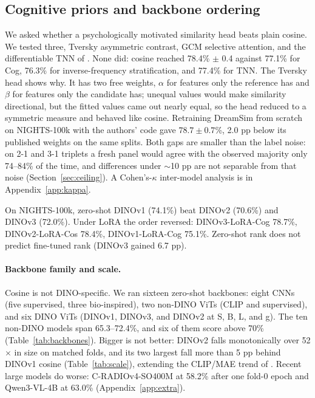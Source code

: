 \documentclass{article}
\begin{document}
\subsection{Cognitive priors and backbone ordering}

We asked whether a psychologically motivated similarity head beats plain cosine. We tested three, Tversky asymmetric contrast, GCM selective attention, and the differentiable TNN of \citet{doumbouya2025tversky}. None did: cosine reached 78.4\% $\pm$ 0.4 against 77.1\% for Cog, 76.3\% for inverse-frequency stratification, and 77.4\% for TNN. The Tversky head shows why. It has two free weights, $\alpha$ for features only the reference has and $\beta$ for features only the candidate has; unequal values would make similarity directional, but the fitted values came out nearly equal, so the head reduced to a symmetric measure and behaved like cosine. Retraining DreamSim from scratch on NIGHTS-100k with the authors' code gave $78.7 \pm 0.7$\%, 2.0 pp below its published weights on the same splits. Both gaps are smaller than the label noise: on 2-1 and 3-1 triplets a fresh panel would agree with the observed majority only 74--84\% of the time, and differences under $\sim$10 pp are not separable from that noise (Section~\ref{sec:ceiling}). A Cohen's-$\kappa$ inter-model analysis is in Appendix~\ref{app:kappa}.

On NIGHTS-100k, zero-shot DINOv1 (74.1\%) beat DINOv2 (70.6\%) and DINOv3 (72.0\%). Under LoRA the order reversed: DINOv3-LoRA-Cog 78.7\%, DINOv2-LoRA-Cos 78.4\%, DINOv1-LoRA-Cog 75.1\%. Zero-shot rank does not predict fine-tuned rank (DINOv3 gained 6.7 pp).

\paragraph{Backbone family and scale.} Cosine is not DINO-specific. We ran sixteen zero-shot backbones: eight CNNs (five supervised, three bio-inspired), two non-DINO ViTs (CLIP and supervised), and six DINO ViTs (DINOv1, DINOv3, and DINOv2 at S, B, L, and g). The ten non-DINO models span 65.3--72.4\%, and six of them score above 70\% (Table~\ref{tab:backbones}). Bigger is not better: DINOv2 falls monotonically over 52$\times$ in size on matched folds, and its two largest fall more than 5 pp behind DINOv1 cosine (Table~\ref{tab:scale}), extending the CLIP/MAE trend of \citet{fu2023dreamsim}. Recent large models do worse: C-RADIOv4-SO400M at 58.2\% after one fold-0 epoch and Qwen3-VL-4B at 63.0\% (Appendix~\ref{app:extra}).
\end{document}

